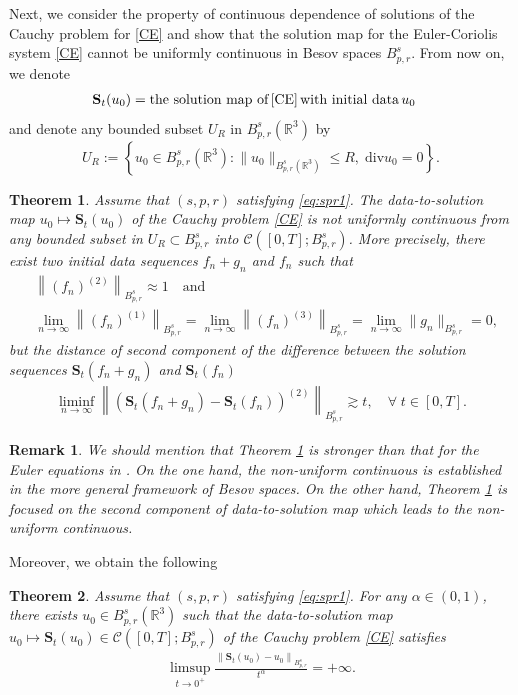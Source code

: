 \documentclass[12pt]{article}
\newtheorem{theorem}{Theorem}[section]
\newtheorem{remark}{Remark}[section]
\newcommand{\bbal}{\begin{align*}}
\newcommand{\R}{\mathbb{R}}
\newcommand{\f}{\left}
\newcommand{\g}{\right}
\begin{document}
Next, we consider the property of continuous dependence of solutions of the Cauchy
problem for \eqref{CE} and show that the solution map for the Euler-Coriolis system \eqref{CE} cannot be uniformly continuous in Besov spaces $B^s_{p,r}$. From now on, we denote
 \begin{align*}
&\mathbf{S}_{t}(u_0)=\text{\rm the solution map of}\, \eqref{CE}\, \text{\rm with initial data}\, u_0
 \end{align*}
and denote any bounded subset $U_R$ in $B^s_{p,r}(\mathbb{R}^3)$ by
$$U_R:=\left\{u_0\in B^s_{p,r}(\mathbb{R}^3): \|u_0\|_{B^s_{p,r}(\mathbb{R}^3)}\leq R,\;\mathrm{div} u_0=0\right\}.$$
\begin{theorem}\label{th2}
Assume that $(s,p,r)$ satisfying \eqref{eq:spr1}.  The data-to-solution map $u_0\mapsto \mathbf{S}_{t}(u_0)$ of the Cauchy problem \eqref{CE} is not uniformly continuous from any bounded subset in $U_R\subset B^s_{p,r}$ into $\mathcal{C}([0,T];B^s_{p,r})$. More precisely, there exist two initial data sequences $f_n+g_n$ and $f_n$ such that
\bbal
&\f\|(f_n)^{(2)}\g\|_{B^s_{p,r}}\approx 1 \quad\text{and}\\
 &\lim_{n\rightarrow \infty}\f\|(f_n)^{(1)}\g\|_{B^s_{p,r}}=\lim_{n\rightarrow \infty}\f\|(f_n)^{(3)}\g\|_{B^s_{p,r}}=\lim_{n\rightarrow \infty}\|g_n\|_{B^s_{p,r}}= 0,
\end{align*}
but the distance of second component of the difference between the solution sequences $\mathbf{S}_t(f_n+g_n)$ and $\mathbf{S}_t(f_n)$
\bbal
\liminf_{n\rightarrow \infty}\f\|\f(\mathbf{S}_t(f_n+g_n)-\mathbf{S}_t(f_n)\g)^{(2)}\g\|_{B^s_{p,r}}\gtrsim t,  \quad \forall \;t\in[0,T].
\end{align*}
\end{theorem}

\begin{remark}
We should mention that Theorem \ref{th2} is stronger than that for the Euler equations in \cite{HM1}. On the one hand, the non-uniform continuous is established in the more general framework of Besov spaces. On the other hand, Theorem \ref{th2} is focused on the second component of data-to-solution map which leads to the non-uniform continuous.
\end{remark}

Moreover, we obtain the following

\begin{theorem}\label{th3}
Assume that $(s,p,r)$ satisfying \eqref{eq:spr1}. For any $\alpha\in(0,1)$, there exists $u_0\in B^s_{p,r}(\R^3)$  such that the data-to-solution map $u_0\mapsto \mathbf{S}_{t}(u_0)\in \mathcal{C}([0,T];B^s_{p,r})$ of the Cauchy problem \eqref{CE} satisfies
\bbal
\limsup_{t\to0^+}\frac{\f\|\mathbf{S}_t(u_0)-u_0\g\|_{B^s_{p,r}}}{t^\alpha}=+\infty.
\end{align*}
\end{theorem}
\end{document}
